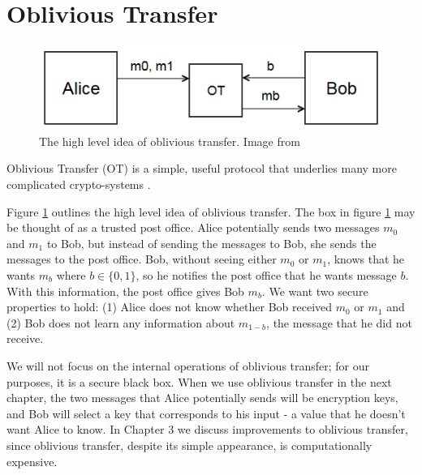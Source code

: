 \section{Oblivious Transfer}

\begin{figure}[h]
    \center
    \includegraphics[scale=.8]{images/ot}
    \caption[Overview of oblivious transfer]{The high level idea of oblivious transfer. Image from \cite{alexirpan}}
    \label{fig:basic-ot}
\end{figure}
Oblivious Transfer (OT) is a simple, useful protocol that underlies many more complicated crypto-systems \cite{EGL82, Rab05}.

Figure \ref{fig:basic-ot} outlines the high level idea of oblivious transfer.
The box in figure \ref{fig:basic-ot} may be thought of as a trusted post office.
Alice potentially sends two messages $m_0$ and $m_1$ to Bob, but instead of sending the messages to Bob, she sends the messages to the post office.
Bob, without seeing either $m_0$ or $m_1$, knows that he wants $m_b$ where $b \in \{0,1\}$, so he notifies the post office that he wants message $b$.
With this information, the post office gives Bob $m_b$.
We want two secure properties to hold: (1) Alice does not know whether Bob received $m_0$ or $m_1$ and (2) Bob does not learn any information about $m_{1-b}$, the message that he did not receive.

We will not focus on the internal operations of oblivious transfer; for our purposes, it is a secure black box.
When we use oblivious transfer in the next chapter, the two messages that Alice potentially sends will be encryption keys, and Bob will select a key that corresponds to his input - a value that he doesn't want Alice to know.
In Chapter 3 we discuss improvements to oblivious transfer, since oblivious transfer, despite its simple appearance, is computationally expensive.
